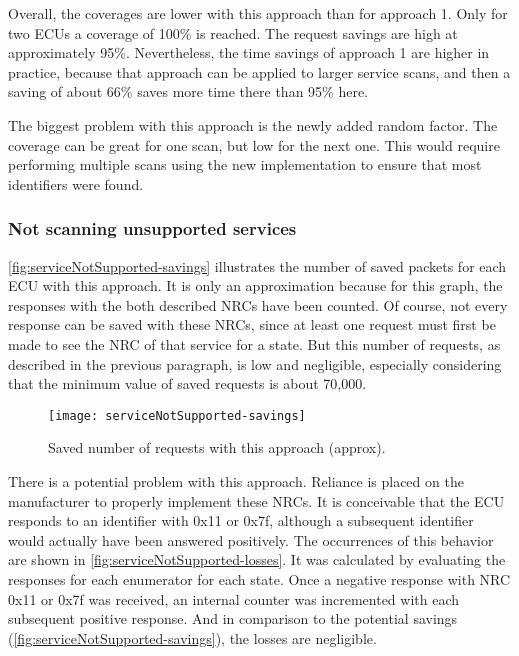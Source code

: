 Overall, the coverages are lower with this approach than for approach 1. Only for two ECUs a coverage of 100\% is reached. The request savings are high at approximately 95\%. Nevertheless, the time savings of approach 1 are higher in practice, because that approach can be applied to larger service scans, and then a saving of about 66\% saves more time there than 95\% here.

The biggest problem with this approach is the newly added random factor. The coverage can be great for one scan, but low for the next one. This would require performing multiple scans using the new implementation to ensure that most identifiers were found.

\subsubsection{Not scanning unsupported services}

\autoref{fig:serviceNotSupported-savings} illustrates the number of saved packets for each ECU with this approach. It is only an approximation because for this graph, the responses with the both described NRCs have been counted. Of course, not every response can be saved with these NRCs, since at least one request must first be made to see the NRC of that service for a state. But this number of requests, as described in the previous paragraph, is low and negligible, especially considering that the minimum value of saved requests is about 70,000.

\begin{figure}[h]
    \centering
    \texttt{[image: serviceNotSupported-savings]}
    \caption{Saved number of requests with this approach (approx).}
    \label{fig:serviceNotSupported-savings}
\end{figure}

There is a potential problem with this approach. Reliance is placed on the manufacturer to properly implement these NRCs. It is conceivable that the ECU responds to an identifier with 0x11 or 0x7f, although a subsequent identifier would actually have been answered positively. The occurrences of this behavior are shown in \autoref{fig:serviceNotSupported-losses}. It was calculated by evaluating the responses for each enumerator for each state. Once a negative response with NRC 0x11 or 0x7f was received, an internal counter was incremented with each subsequent positive response.
And in comparison to the potential savings (\autoref{fig:serviceNotSupported-savings}), the losses are negligible.

